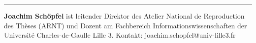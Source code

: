 \begin{center}\rule{3in}{0.4pt}\end{center}

\textbf{Joachim Schöpfel} ist leitender Direktor des Atelier National de
Reproduction des Thèses (ARNT) und Dozent am Fachbereich
Informationswissenschaften der Université Charles-de-Gaulle Lille 3.
Kontakt: joachim.schopfel@univ-lille3.fr
